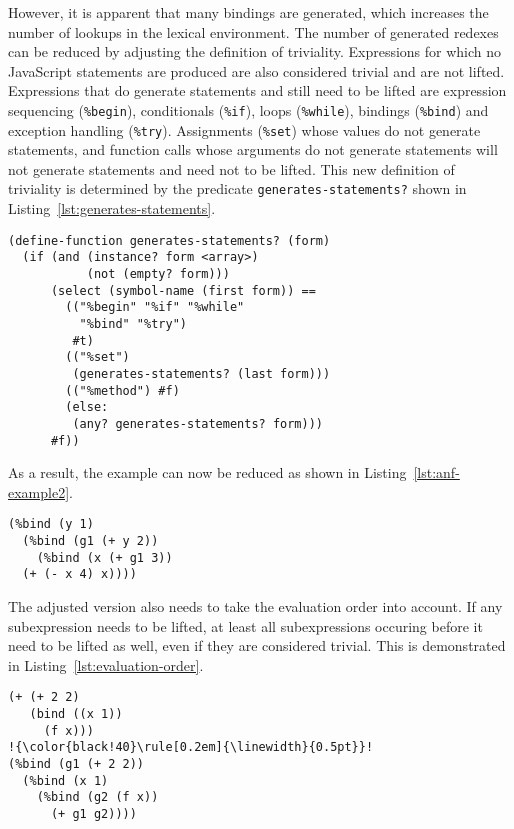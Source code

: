 \documentclass{acm_proc_article-sp}
\begin{document}
However, it is apparent that many bindings are generated, which
increases the number of lookups in the lexical environment. The number
of generated redexes can be reduced by adjusting the definition of
triviality. Expressions for which no JavaScript statements are
produced are also considered trivial and are not lifted. Expressions
that do generate statements and still need to be lifted are expression
sequencing (\texttt{\%begin}), conditionals (\texttt{\%if}), loops
(\texttt{\%while}), bindings (\texttt{\%bind}) and exception handling
(\texttt{\%try}). Assignments (\texttt{\%set}) whose values do not
generate statements, and function calls whose arguments do not
generate statements will not generate statements and need not to be
lifted. This new definition of triviality is determined by the
predicate \texttt{generates-statements?} shown in
Listing~\ref{lst:generates-statements}.

\begin{lstlisting}[label=lst:generates-statements,
    caption=Determining generation of JavaScript statements]
(define-function generates-statements? (form)
  (if (and (instance? form <array>)
           (not (empty? form)))
      (select (symbol-name (first form)) ==
        (("%begin" "%if" "%while"
          "%bind" "%try")
         #t)
        (("%set")
         (generates-statements? (last form)))
        (("%method") #f)
        (else:
         (any? generates-statements? form)))
      #f))
\end{lstlisting}

As a result, the example can now be reduced as shown in
Listing~\ref{lst:anf-example2}.

\begin{lstlisting}[label=lst:anf-example2,
    caption=Resulting IR when using adjusted ANF]
(%bind (y 1)
  (%bind (g1 (+ y 2))
    (%bind (x (+ g1 3))
  (+ (- x 4) x))))
\end{lstlisting}

The adjusted version also needs to take the evaluation order into
account. If any subexpression needs to be lifted, at least all
subexpressions occuring before it need to be lifted as well, even if
they are considered trivial. This is demonstrated in
Listing~\ref{lst:evaluation-order}.


\begin{lstlisting}[label=lst:evaluation-order,
    escapechar=!,
    caption=Adjusted ANF preserves evaluation order]
(+ (+ 2 2)
   (bind ((x 1))
     (f x)))
!{\color{black!40}\rule[0.2em]{\linewidth}{0.5pt}}!
(%bind (g1 (+ 2 2))
  (%bind (x 1)
    (%bind (g2 (f x))
      (+ g1 g2))))
\end{lstlisting}
\end{document}
